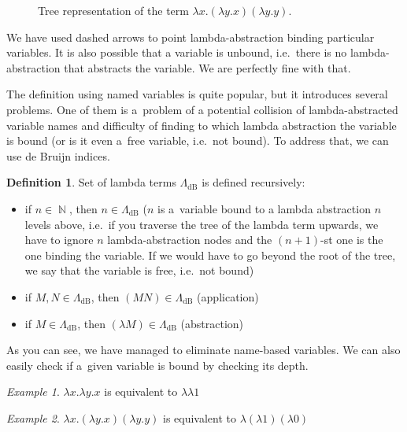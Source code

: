 \documentclass[final]{article}
\theoremstyle{definition}
\newtheorem{definition}{Definition}[subsection]
\theoremstyle{definition}
\theoremstyle{remark}
\newtheorem{example}{Example}[subsection]
\newcommand{\LambdadB}{\ensuremath{\Lambda_{\text{dB}}}}
\DeclareMathOperator{\N}{\mathbb{N}}
\begin{document}
\begin{figure}[H]
    \centering
    
    \caption{Tree representation of the term \(\lambda x. (\lambda y.x) (\lambda y.y)\).}%
    \label{fig:lambda_tree_example}
\end{figure}

We have used dashed arrows to point lambda-abstraction binding particular variables. It is also possible that a variable is unbound, i.e.~there is no lambda-abstraction that abstracts the variable. We are perfectly fine with that.

The definition using named variables is quite popular, but it introduces several problems. One of them is a~problem of a potential collision of lambda-abstracted variable names and difficulty of finding to which lambda abstraction the variable is bound (or is it even a~free variable, i.e.~not bound). To address that, we can use de Bruijn indices.

\begin{definition}
    Set of lambda terms \(\LambdadB\) is defined recursively:
    \begin{itemize}
        \item if \(n \in \N\), then \(n \in \LambdadB\) (\(n\) is a~variable bound to a lambda abstraction \(n\) levels above, i.e.~if you traverse the tree of the lambda term upwards, we have to ignore \(n\) lambda-abstraction nodes and the \((n+1)\)-st one is the one binding the variable. If we would have to go beyond the root of the tree, we say that the variable is free, i.e.~not bound)
        \item if \(M, N \in \LambdadB\), then \((M N) \in \LambdadB\) (application)
        \item if \(M \in \LambdadB\), then \((\lambda M) \in \LambdadB\) (abstraction)
    \end{itemize}
\end{definition}

As you can see, we have managed to eliminate name-based variables. We can also easily check if a~given variable is bound by checking its depth.

\begin{example}
    \(\lambda x.\lambda y.x\) is equivalent to \(\lambda \lambda 1\)
\end{example}

\begin{example}
    \(\lambda x. (\lambda y.x) (\lambda y.y)\) is equivalent to \(\lambda (\lambda 1) (\lambda 0)\)
\end{example}
\end{document}
